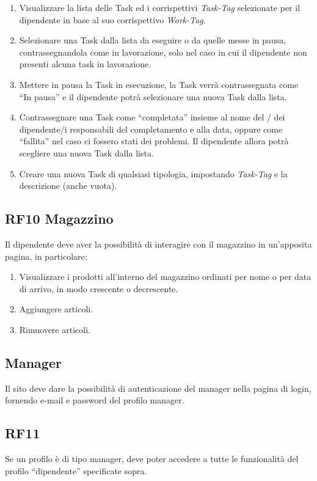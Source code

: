\documentclass{report}
\begin{document}
\begin{enumerate}
	\item Visualizzare la lista delle Task ed i corrispettivi \textit{Task-Tag} selezionate per il dipendente in base al suo corrispettivo \textit{Work-Tag}.
	
	\item Selezionare una Task dalla lista da eseguire o da quelle messe in pausa, contrassegnandola come in lavorazione, solo nel caso in cui il dipendente non presenti alcuna task in lavorazione.
	
	\item Mettere in pausa la Task in esecuzione, la Task verrà contrassegnata come “In pausa” e il dipendente potrà selezionare una nuova Task dalla lista.
	
	\item Contrassegnare una Task come “completata”  insieme al nome del / dei dipendente/i responsabili del completamento e alla data, oppure come “fallita” nel caso ci fossero stati dei problemi. Il dipendente allora potrà scegliere una nuova Task dalla lista.
	
	\item Creare una nuova Task di qualsiasi tipologia, impostando \textit{Task-Tag} e la descrizione (anche vuota).
	
\end{enumerate}

\subsection*{RF10 Magazzino}
Il dipendente deve aver la possibilità di interagire con il magazzino in un'apposita pagina, in particolare:
\begin{enumerate}
	\item Visualizzare i prodotti all'interno del magazzino ordinati per nome o per data di arrivo, in modo crescente o decrescente.
	\item Aggiungere articoli.
	\item Rimuovere articoli.
\end{enumerate}

\subsection{Manager}
Il sito deve dare la possibilità di autenticazione del manager nella pagina di login, fornendo e-mail e password del profilo manager.

\subsection*{RF11}
Se un profilo è di tipo manager, deve poter accedere a tutte le funzionalità del profilo “dipendente” specificate sopra.
\end{document}
